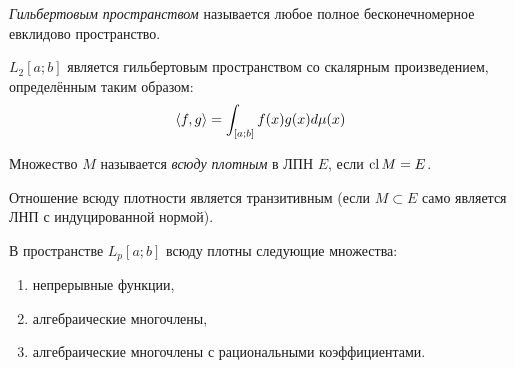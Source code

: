 \begin{definition}
	\textit{Гильбертовым пространством} называется любое полное бесконечномерное евклидово пространство.
\end{definition}

\begin{corollary}
	$L_2[a; b]$ является гильбертовым пространством со скалярным произведением, определённым таким образом:
	\[
		\left\langle f, g\right\rangle = \int_{[a; b]} f(x)g(x)d\mu(x)
	\]
\end{corollary}

\begin{definition}
	Множество $M$ называется \textit{всюду плотным} в ЛПН $E$, если $\operatorname{cl} M = E$.
\end{definition}

\begin{exercise}
	Отношение всюду плотности является транзитивным (если $M \subset E$ само является ЛНП с индуцированной нормой).
\end{exercise}

\begin{theorem}
	В пространстве $L_p[a; b]$ всюду плотны следующие множества:
	\begin{enumerate}
		\item непрерывные функции,
		\item алгебраические многочлены,
		\item алгебраические многочлены с рациональными коэффициентами.
	\end{enumerate}
\end{theorem}

